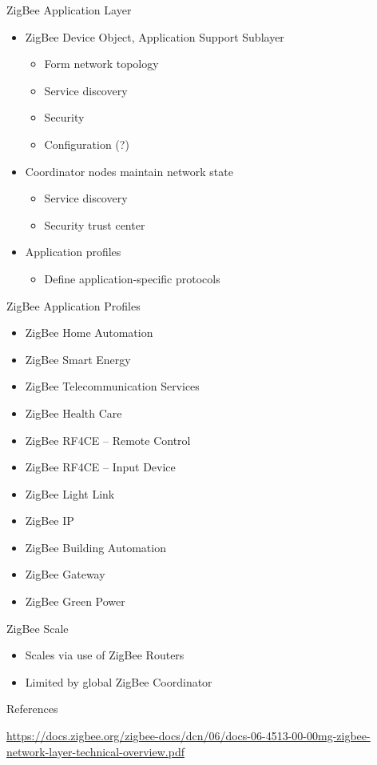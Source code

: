 \documentclass{beamer}
\begin{document}
\begin{frame}{ZigBee Application Layer}
  \begin{itemize}
  	\item ZigBee Device Object, Application Support Sublayer
  	\begin{itemize}
  		\item Form network topology
  		\item Service discovery
  		\item Security
  		\item Configuration (?)
  	\end{itemize}
  	\item Coordinator nodes maintain network state
  	\begin{itemize}
  		\item Service discovery
  		\item Security trust center
  	\end{itemize}
  	\item Application profiles
  	\begin{itemize}
  		\item Define application-specific protocols 
  	\end{itemize}
  \end{itemize}
\end{frame}

\begin{frame}{ZigBee Application Profiles}
  \begin{itemize}
  	\item ZigBee Home Automation
    \item ZigBee Smart Energy
    \item ZigBee Telecommunication Services
    \item ZigBee Health Care
    \item ZigBee RF4CE – Remote Control
    \item ZigBee RF4CE – Input Device
    \item ZigBee Light Link
    \item ZigBee IP
    \item ZigBee Building Automation
    \item ZigBee Gateway
    \item ZigBee Green Power
  \end{itemize}
\end{frame}

\begin{frame}{ZigBee Scale}
  \begin{itemize}
	\item Scales via use of ZigBee Routers
	\item Limited by global ZigBee Coordinator
  \end{itemize}
\end{frame}

\begin{frame}{References}
\begin{thebibliography}{9}
\url{https://docs.zigbee.org/zigbee-docs/dcn/06/docs-06-4513-00-00mg-zigbee-network-layer-technical-overview.pdf}
\end{thebibliography}
\end{frame}
\end{document}
